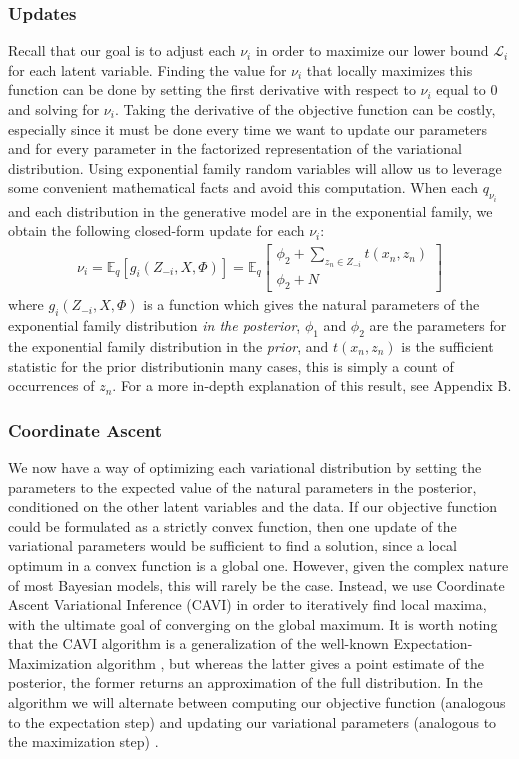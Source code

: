 \documentclass[12pt,letterpaper]{article}
\begin{document}
\subsubsection{Updates}
Recall that our goal is to adjust each $\nu_i$ in order to maximize our lower bound $\mathcal{L}_i$ for each latent variable. Finding the value for $\nu_i$ that locally maximizes this function can be done by setting the first derivative with respect to $\nu_i$ equal to 0 and solving for $\nu_i$. Taking the derivative of the objective function can be costly, especially since it must be done every time we want to update our parameters and for every parameter in the factorized representation of the variational distribution. Using exponential family random variables will allow us to leverage some convenient mathematical facts and avoid this computation. When each $q_{\nu_i}$ and each distribution in the generative model are in the exponential family, we obtain the following closed-form update for each $\nu_i$: 
\begin{align}
\nu_i = \mathbb{E}_q[g_i(Z_{-i}, X, \Phi)] = \mathbb{E}_q \begin{bmatrix} \phi_2 + \sum\limits_{z_n \in Z_{-i}} t(x_n, z_n) \\ \phi_2 + N \end{bmatrix}
\end{align}
where $g_i(Z_{-i}, X, \Phi)$ is a function which gives the natural parameters of the exponential family distribution \textit{in the posterior}, $\phi_1$ and $\phi_2$ are the parameters for the exponential family distribution in the \textit{prior}, and $t(x_n, z_n)$ is the sufficient statistic for the prior distribution\textemdash in many cases, this is simply a count of occurrences of $z_n$. For a more in-depth explanation of this result, see Appendix B. 

\subsubsection{Coordinate Ascent}
We now have a way of optimizing each variational distribution by setting the parameters to the expected value of the natural parameters in the posterior, conditioned on the other latent variables and the data. If our objective function could be formulated as a strictly convex function, then one update of the variational parameters would be sufficient to find a solution, since a local optimum in a convex function is a global one. However, given the complex nature of most Bayesian models, this will rarely be the case. Instead, we use Coordinate Ascent Variational Inference (CAVI) in order to iteratively find local maxima, with the ultimate goal of converging on the global maximum. It is worth noting that the CAVI algorithm is a generalization of the well-known Expectation-Maximization algorithm \citep{dempster:1977} , but whereas the latter gives a point estimate of the posterior, the former returns an approximation of the full distribution. In the algorithm we will alternate between computing our objective function (analogous to the expectation step) and updating our variational parameters (analogous to the maximization step) \citep{neal:1998}.
\end{document}
